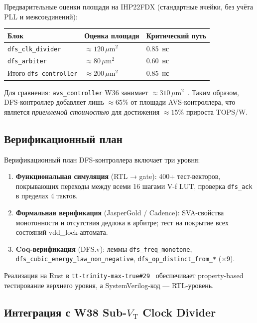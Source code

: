 Предварительные оценки площади на IHP22FDX (стандартные ячейки,
без учёта PLL и межсоединений):
\begin{center}
\begin{tabular}{lll}
\hline
Блок & Оценка площади & Критический путь \\
\hline
\texttt{dfs\_clk\_divider} & $\approx 120\,\mu\text{m}^2$ & 0.85~нс \\
\texttt{dfs\_arbiter}      & $\approx 80\,\mu\text{m}^2$  & 0.60~нс \\
Итого \texttt{dfs\_controller} & $\approx 200\,\mu\text{m}^2$ & 0.85~нс \\
\hline
\end{tabular}
\end{center}

Для сравнения: \texttt{avs\_controller} W36 занимает
$\approx 310\,\mu\text{m}^2$~\cite{trinity-fpga134}.
Таким образом, DFS-контроллер добавляет лишь $\approx 65\%$ от
площади AVS-контроллера, что является \emph{приемлемой стоимостью}
для достижения $\approx 15\%$ прироста TOPS/W.

\subsection{Верификационный план}
\label{subsec:verif-plan}

Верификационный план DFS-контроллера включает три уровня:
\begin{enumerate}
  \item \textbf{Функциональная симуляция} (RTL → gate):
        400+ тест-векторов, покрывающих переходы между всеми 16 шагами
        V-f LUT, проверка \texttt{dfs\_ack} в пределах 4 тактов.
  \item \textbf{Формальная верификация} (JasperGold / Cadence):
        SVA-свойства монотонности и отсутствия дедлока в арбитре;
        тест на покрытие всех состояний vdd\_lock-автомата.
  \item \textbf{Coq-верификация} (DFS.v):
        леммы \texttt{dfs\_freq\_monotone},
        \texttt{dfs\_cubic\_energy\_law\_non\_negative},
        \texttt{dfs\_op\_distinct\_from\_*} (×9).
\end{enumerate}

Реализация на Rust в \texttt{tt-trinity-max-true\#29}~\cite{tt-trinity-max-true29}
обеспечивает property-based тестирование верхнего уровня,
а SystemVerilog-код \cite{trinity-fpga140} — RTL-уровень.

\subsection{Интеграция с W38 Sub-$V_{\mathrm{T}}$ Clock Divider}
\label{subsec:dfs-w38-integration}

